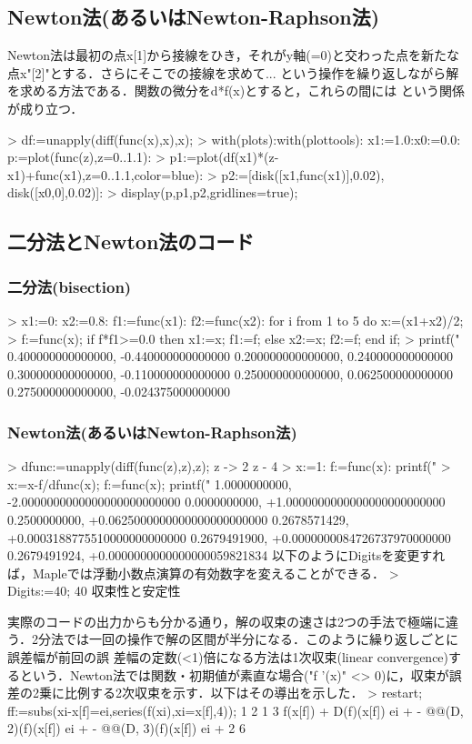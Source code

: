 
\subsection{Newton法(あるいはNewton-Raphson法)}
Newton法は最初の点x[1]から接線をひき，それがy軸(=0)と交わった点を新たな点x"[2]"とする．さらにそこでの接線を求めて...
という操作を繰り返しながら解を求める方法である．関数の微分をd*f(x)とすると，これらの間には
という関係が成り立つ．
\begin{MapleInput}
> df:=unapply(diff(func(x),x),x);
> with(plots):with(plottools): x1:=1.0:x0:=0.0: p:=plot(func(z),z=0..1.1):
> p1:=plot(df(x1)*(z-x1)+func(x1),z=0..1.1,color=blue):
> p2:=[disk([x1,func(x1)],0.02), disk([x0,0],0.02)]:
> display(p,p1,p2,gridlines=true);
\end{MapleInput}

\subsection{二分法とNewton法のコード}
\subsubsection{二分法(bisection)}

> x1:=0: x2:=0.8: f1:=func(x1): f2:=func(x2): for i from 1 to 5 do x:=(x1+x2)/2;
> f:=func(x); if f*f1>=0.0 then x1:=x; f1:=f; else x2:=x; f2:=f; end if;
> printf("%
0.400000000000000, -0.440000000000000 0.200000000000000, 0.240000000000000
0.300000000000000, -0.110000000000000 0.250000000000000, 0.062500000000000
0.275000000000000, -0.024375000000000

\subsubsection{Newton法(あるいはNewton-Raphson法)}
> dfunc:=unapply(diff(func(z),z),z);
z -> 2 z - 4
> x:=1: f:=func(x): printf("%
> x:=x-f/dfunc(x); f:=func(x); printf("%
1.0000000000, -2.0000000000000000000000000 0.0000000000,
+1.0000000000000000000000000 0.2500000000, +0.0625000000000000000000000
0.2678571429, +0.0003188775510000000000000 0.2679491900,
+0.0000000084726737970000000 0.2679491924, +0.0000000000000000059821834
以下のようにDigitsを変更すれば，Mapleでは浮動小数点演算の有効数字を変えることができる．
> Digits:=40;
                                      40
収束性と安定性

実際のコードの出力からも分かる通り，解の収束の速さは2つの手法で極端に違う．2分法では一回の操作で解の区間が半分になる．このように繰り返しごとに誤差幅が前回の誤
差幅の定数(<1)倍になる方法は1次収束(linear convergence)するという．Newton法では関数・初期値が素直な場合("f '(x)" <>
0)に，収束が誤差の2乗に比例する2次収束を示す．以下はその導出を示した．
> restart; ff:=subs(xi-x[f]=ei,series(f(xi),xi=x[f],4));
                          1                     2   1                     3   
f(x[f]) + D(f)(x[f]) ei + - @@(D, 2)(f)(x[f]) ei  + - @@(D, 3)(f)(x[f]) ei  + 
                          2                         6                         

